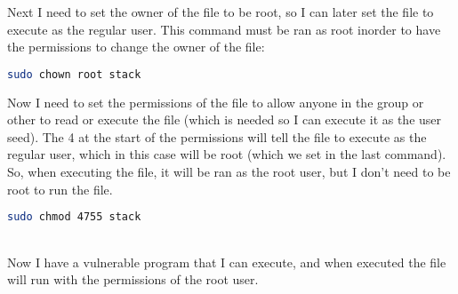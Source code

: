 \documentclass[14pt]{extarticle}
\begin{document}
Next I need to set the owner of the file to be root, so I can later set the file to execute as the regular user\cite{seed-bof}. This command must be ran as root inorder to have the permissions to change the owner of the file:
\begin{lstlisting}[language=sh]
    sudo chown root stack
\end{lstlisting}

Now I need to set the permissions of the file to allow anyone in the group or other to read or execute the file (which is needed so I can execute it as the user seed). The 4 at the start of the permissions will tell the file to execute as the regular user, which in this case will be root (which we set in the last command). So, when executing the file, it will be ran as the root user, but I don't need to be root to run the file.
\begin{lstlisting}[language=sh]
    sudo chmod 4755 stack
\end{lstlisting} \cite{seed-bof}\\
Now I have a vulnerable program that I can execute, and when executed the file will run with the permissions of the root user.
\end{document}
